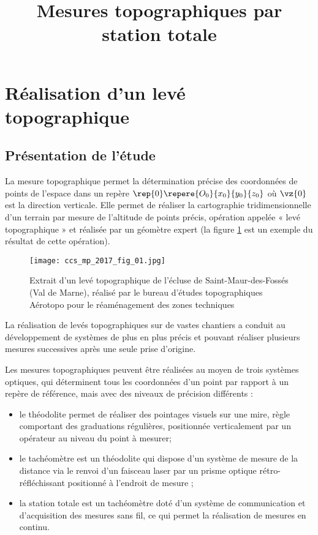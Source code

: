\title{Mesures topographiques par station totale}

\section{Réalisation d’un levé topographique \label{CCS_MP_2017:p1}}
\subsection{Présentation de l'étude}

La mesure topographique permet la détermination précise des coordonnées de points de l’espace dans un repère $\rep{0}\repere{O_0}{x_0}{y_0}{z_0}$ où $\vz{0}$ est la direction verticale. Elle permet de réaliser la cartographie tridimensionnelle d’un
terrain par mesure de l’altitude de points précis, opération appelée « levé topographique » et réalisée par un
géomètre expert (la figure \ref{CCS_MP_2017:fig_01} est un exemple du résultat de cette opération).

\begin{figure}[!h]
\centering
\texttt{[image: ccs\_mp\_2017\_fig\_01.jpg]}
\caption{Extrait d’un levé topographique de l’écluse de Saint-Maur-des-Fossés (Val de Marne), réalisé par le bureau d’études topographiques Aérotopo pour le réaménagement des zones techniques \label{CCS_MP_2017:fig_01}}
\end{figure}

La réalisation de levés topographiques sur de vastes chantiers a conduit au développement de systèmes de plus
en plus précis et pouvant réaliser plusieurs mesures successives après une seule prise d’origine.

Les mesures topographiques peuvent être réalisées au moyen de trois systèmes optiques, qui déterminent tous les coordonnées d'un point par rapport à un repère de référence, mais avec des niveaux de précision différents :

\begin{itemize}
  \item le théodolite permet de réaliser des pointages visuels sur une mire, règle comportant des graduations régulières, positionnée verticalement par un opérateur au niveau du point à mesurer;
  \item le tachéomètre est un théodolite qui dispose d'un système de mesure de la distance via le renvoi d'un faisceau laser par un prisme optique rétro-réfléchissant positionné à l'endroit de mesure ;
  \item la station totale est un tachéomètre doté d'un système de communication et d'acquisition des mesures sans fil, ce qui permet la réalisation de mesures en continu.
\end{itemize}

